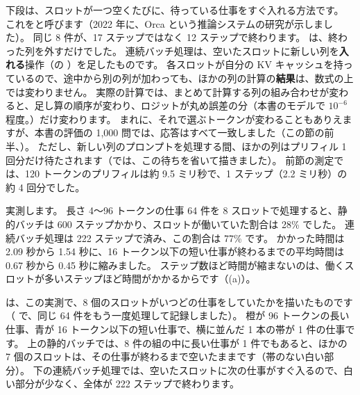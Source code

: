 下段は、スロットが一つ空くたびに、待っている仕事をすぐ入れる方法です。
これをと呼びます（2022 年に、Orca という推論システムの研究が示しました）。
同じ 8 件が、17 ステップではなく 12 ステップで終わります。
は、終わった列を外すだけでした。
連続バッチ処理は、空いたスロットに新しい列を\textbf{入れる}操作（の ）を足したものです。
各スロットが自分の KV キャッシュを持っているので、途中から別の列が加わっても、ほかの列の計算の\textbf{結果}は、数式の上では変わりません。
実際の計算では、まとめて計算する列の組み合わせが変わると、足し算の順序が変わり、ロジットが丸め誤差の分（本書のモデルで $10^{-6}$ 程度。）だけ変わります。
まれに、それで選ぶトークンが変わることもありえますが、本書の評価の 1,000 問では、応答はすべて一致しました（この節の前半、）。
ただし、新しい列のプロンプトを処理する間、ほかの列はプリフィル 1 回分だけ待たされます（では、この待ちを省いて描きました）。
前節の測定では、120 トークンのプリフィルは約 9.5 ミリ秒で、1 ステップ（2.2 ミリ秒）の約 4 回分でした。

実測します。
長さ 4〜96 トークンの仕事 64 件を 8 スロットで処理すると、静的バッチは 600 ステップかかり、スロットが働いていた割合は 28\% でした。
連続バッチ処理は 222 ステップで済み、この割合は 77\% です。
かかった時間は 2.09 秒から 1.54 秒に、16 トークン以下の短い仕事が終わるまでの平均時間は 0.67 秒から 0.45 秒に縮みました。
ステップ数ほど時間が縮まないのは、働くスロットが多いステップほど時間がかかるからです（(a)）。

は、この実測で、8 個のスロットがいつどの仕事をしていたかを描いたものです（ で、同じ 64 件をもう一度処理して記録しました）。
橙が 96 トークンの長い仕事、青が 16 トークン以下の短い仕事で、横に並んだ 1 本の帯が 1 件の仕事です。
上の静的バッチでは、8 件の組の中に長い仕事が 1 件でもあると、ほかの 7 個のスロットは、その仕事が終わるまで空いたままです（帯のない白い部分）。
下の連続バッチ処理では、空いたスロットに次の仕事がすぐ入るので、白い部分が少なく、全体が 222 ステップで終わります。

